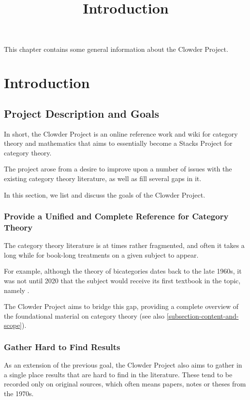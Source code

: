 

%



\title{Introduction}

\maketitle

\label{section-phantom}

This chapter contains some general information about the Clowder Project.

\ChapterTableOfContents

\section{Introduction}\label{section-introduction}
\subsection{Project Description and Goals}\label{subsection-project-description-and-goals}
In short, the Clowder Project is an online reference work and wiki for category theory and mathematics that aims to essentially become a Stacks Project for category theory.

The project arose from a desire to improve upon a number of issues with the existing category theory literature, as well as fill several gaps in it.

In this section, we list and discuss the goals of the Clowder Project.
\subsubsection{Provide a Unified and Complete Reference for Category Theory}\label{subsubsection-provide-a-unified-and-complete-reference-for-category-theory}
The category theory literature is at times rather fragmented, and often it takes a long while for book-long treatments on a given subject to appear.

For example, although the theory of bicategories dates back to the late 1960s, it was not until 2020 that the subject would receive its first textbook in the topic, namely \cite{2-categories-book}.

The Clowder Project aims to bridge this gap, providing a complete overview of the foundational material on category theory (see also \cref{subsection-content-and-scope}).
\subsubsection{Gather Hard to Find Results}\label{subsubsection-gather-hard-to-find-results}
As an extension of the previous goal, the Clowder Project also aims to gather in a single place results that are hard to find in the literature. These tend to be recorded only on original sources, which often means papers, notes or theses from the 1970s.

